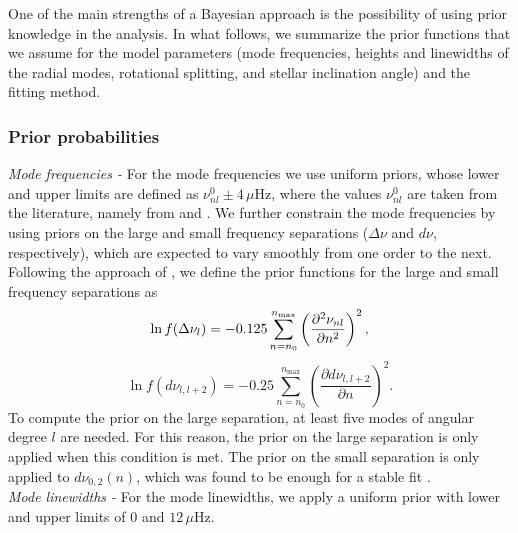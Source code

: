 \documentclass[twocolumn]{aastex61}%
\begin{document}
One of the main strengths of a Bayesian approach is the possibility of using prior knowledge in the analysis. In what follows, we summarize the prior functions that we assume for the model parameters (mode frequencies, heights and linewidths of the radial modes, rotational splitting, and stellar inclination angle) and the fitting method.

\subsubsection{Prior probabilities}\label{sec:prior}

{\it Mode frequencies -} For the mode frequencies we use uniform priors, whose lower and upper limits are defined as $\nu_{nl}^0\pm4\,\mu\text{Hz}$, where the values $\nu_{nl}^0$ are taken from the literature, namely from \citet{Davies2016} and \citet{Lund2017}. We further constrain the mode frequencies by using priors on the large and small frequency separations ($\Delta\nu$ and $d\nu$, respectively), which are expected to vary smoothly from one order to the next. Following the approach of \citet{Davies2016}, we define the prior functions for the large and small frequency separations as \vspace{-0.1cm}
\begin{equation}
\ln f(\Delta\nu_l)=-0.125\sum_{n=n_0}^{n_\text{max}}\left(\dfrac{\partial^2\nu_{nl}}{\partial n^2}\right)^2,\vspace{-0.1cm}
\end{equation}
\begin{equation}
\ln f(d\nu_{l,l+2})=-0.25\sum_{n=n_0}^{n_\text{max}}\left(\dfrac{\partial d\nu_{l,l+2}}{\partial n}\right)^2.
\end{equation}
To compute the prior on the large separation, at least five modes of angular degree $l$ are needed. For this reason, the prior on the large separation is only applied when this condition is met. The prior on the small separation is only applied to $d\nu_{0,2}(n)$, which was found to be enough for a stable fit \citep{Davies2016}.\\

{\it Mode linewidths -} For the mode linewidths, we apply a uniform prior with lower and upper limits of $0$ and $12\,\mu\text{Hz}$.\\
\end{document}
